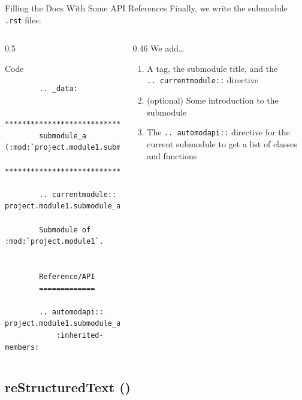 \begin{frame}[fragile]{Filling the Docs With Some API References}
  Finally, we write the submodule \texttt{.rst} files:

  \begin{columns}[onlytextwidth]
    \begin{column}{0.5\textwidth}
      \begin{block}{Code}
      \footnotesize
      \begin{verbatim}
        .. _data:

        ************************************************
        submodule_a (:mod:`project.module1.submodule_a`)
        ************************************************

        .. currentmodule:: project.module1.submodule_a

        Submodule of :mod:`project.module1`.


        Reference/API
        =============

        .. automodapi:: project.module1.submodule_a
            :inherited-members:
      \end{verbatim}
      \end{block}
    \end{column}
    \hfill
    \begin{column}{0.46\textwidth}
      We add\dots
      \begin{enumerate}
        \setlength{\itemsep}{1.5em}
        \item A tag, the submodule title, and the\\\texttt{.. currentmodule::} directive
        \item (optional) Some introduction to the submodule
        \item The \texttt{.. automodapi::} directive for the current submodule to get a list of
          classes and functions
      \end{enumerate}
    \end{column}
  \end{columns}
\end{frame}


\subsection{reStructuredText (\reST)}


